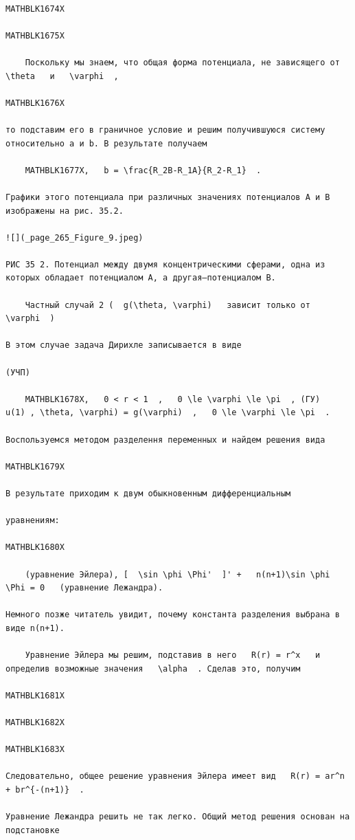 \documentclass[
]{article}
\begin{document}
\begin{verbatim}

MATHBLK1674X

MATHBLK1675X

    Поскольку мы знаем, что общая форма потенциала, не зависящего от   \theta   и   \varphi  ,

MATHBLK1676X

то подставим его в граничное условие и решим получившуюся систему относительно а и b. В результате получаем

    MATHBLK1677X,   b = \frac{R_2B-R_1A}{R_2-R_1}  .

Графики этого потенциала при различных значениях потенциалов A и B изображены на рис. 35.2.

![](_page_265_Figure_9.jpeg)

РИС 35 2. Потенциал между двумя концентрическими сферами, одна из которых обладает потенциалом A, а другая—потенциалом B.

    Частный случай 2 (  g(\theta, \varphi)   зависит только от   \varphi  )

В этом случае задача Дирихле записывается в виде

(УЧП)

    MATHBLK1678X,   0 < r < 1  ,   0 \le \varphi \le \pi  , (ГУ)   u(1) , \theta, \varphi) = g(\varphi)  ,   0 \le \varphi \le \pi  .

Воспользуемся методом разделення переменных и найдем решения вида

MATHBLK1679X

В результате приходим к двум обыкновенным дифференциальным

уравнениям:

MATHBLK1680X

    (уравнение Эйлера), [  \sin \phi \Phi'  ]' +   n(n+1)\sin \phi \Phi = 0   (уравнение Лежандра).

Немного позже читатель увидит, почему константа разделения выбрана в виде n(n+1).

    Уравнение Эйлера мы решим, подставив в него   R(r) = r^x   и определив возможные значения   \alpha  . Сделав это, получим

MATHBLK1681X

MATHBLK1682X

MATHBLK1683X

Следовательно, общее решение уравнения Эйлера имеет вид   R(r) = ar^n + br^{-(n+1)}  .

Уравнение Лежандра решить не так легко. Общий метод решения основан на подстановке


\end{verbatim}
\end{document}
